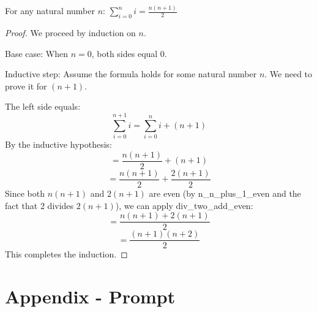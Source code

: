 \begin{theorem} 
\label{sum_first_n}
\leanok
For any natural number $n$:
$\sum_{i=0}^n i = \frac{n(n+1)}{2}$
\end{theorem}

\begin{proof}
\leanok
{}
We proceed by induction on $n$.

Base case: When $n = 0$, both sides equal 0.

Inductive step: Assume the formula holds for some natural number $n$. We need to prove it for $(n+1)$.

The left side equals:
\[ \sum_{i=0}^{n+1} i = \sum_{i=0}^n i + (n+1) \]
By the inductive hypothesis:
\[= \frac{n(n+1)}{2} + (n+1) \]
\[= \frac{n(n+1)}{2} + \frac{2(n+1)}{2} \]
Since both $n(n+1)$ and $2(n+1)$ are even (by n\_n\_plus\_1\_even and the fact that 2 divides $2(n+1)$), we can apply div\_two\_add\_even:
\[= \frac{n(n+1) + 2(n+1)}{2}\]
\[= \frac{(n+1)(n+2)}{2}\]
This completes the induction.
\end{proof}

\chapter{Appendix - Prompt}


